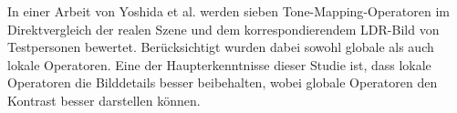 In einer Arbeit von Yoshida et al. \cite{tone_mapper_1} werden sieben \gls{Tone-Mapping}-Operatoren im Direktvergleich der realen Szene und dem korrespondierendem \gls{LDR}-Bild von Testpersonen bewertet. Berücksichtigt wurden dabei sowohl globale als auch lokale Operatoren. Eine der Haupterkenntnisse dieser Studie ist, dass lokale Operatoren die Bilddetails besser beibehalten, wobei globale Operatoren den Kontrast besser darstellen können.

